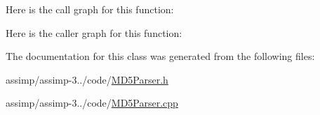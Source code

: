 Here is the call graph for this function\+:




Here is the caller graph for this function\+:




The documentation for this class was generated from the following files\+:\begin{DoxyCompactItemize}
\item 
assimp/assimp-\/3../code/\hyperlink{_m_d5_parser_8h}{M\+D5\+Parser.\+h}\item 
assimp/assimp-\/3../code/\hyperlink{_m_d5_parser_8cpp}{M\+D5\+Parser.\+cpp}\end{DoxyCompactItemize}

